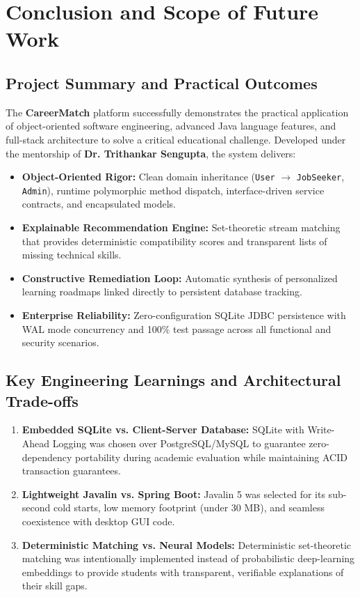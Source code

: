 \documentclass[11pt,a4paper]{report}
\begin{document}
\chapter{Conclusion and Scope of Future Work}

\section{Project Summary and Practical Outcomes}
The \textbf{CareerMatch} platform successfully demonstrates the practical application of object-oriented software engineering, advanced Java language features, and full-stack architecture to solve a critical educational challenge. Developed under the mentorship of \textbf{Dr. Trithankar Sengupta}, the system delivers:
\begin{itemize}
    \item \textbf{Object-Oriented Rigor:} Clean domain inheritance (\texttt{User} $\rightarrow$ \texttt{JobSeeker}, \texttt{Admin}), runtime polymorphic method dispatch, interface-driven service contracts, and encapsulated models.
    \item \textbf{Explainable Recommendation Engine:} Set-theoretic stream matching that provides deterministic compatibility scores and transparent lists of missing technical skills.
    \item \textbf{Constructive Remediation Loop:} Automatic synthesis of personalized learning roadmaps linked directly to persistent database tracking.
    \item \textbf{Enterprise Reliability:} Zero-configuration SQLite JDBC persistence with WAL mode concurrency and 100\% test passage across all functional and security scenarios.
\end{itemize}

\section{Key Engineering Learnings and Architectural Trade-offs}
\begin{enumerate}
    \item \textbf{Embedded SQLite vs. Client-Server Database:} SQLite with Write-Ahead Logging was chosen over PostgreSQL/MySQL to guarantee zero-dependency portability during academic evaluation while maintaining ACID transaction guarantees.
    \item \textbf{Lightweight Javalin vs. Spring Boot:} Javalin 5 was selected for its sub-second cold starts, low memory footprint (under 30 MB), and seamless coexistence with desktop GUI code.
    \item \textbf{Deterministic Matching vs. Neural Models:} Deterministic set-theoretic matching was intentionally implemented instead of probabilistic deep-learning embeddings to provide students with transparent, verifiable explanations of their skill gaps.
\end{enumerate}
\end{document}
